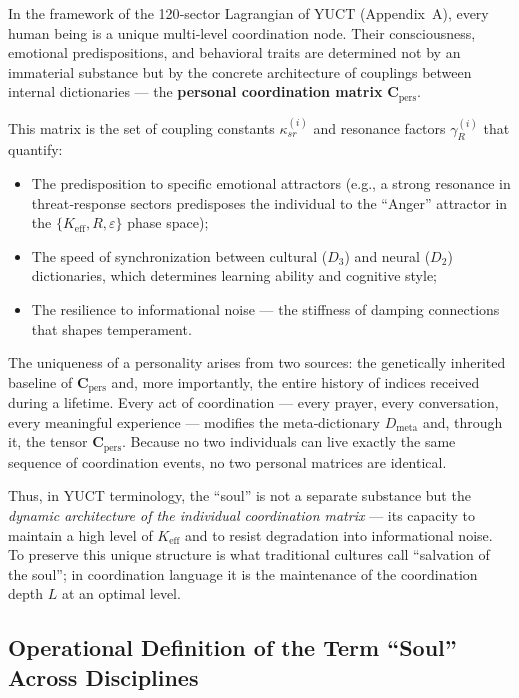 \documentclass[12pt,a4paper]{article}
\begin{document}
	In the framework of the 120‑sector Lagrangian of YUCT (Appendix~A), every human being is a unique multi‑level coordination node. Their consciousness, emotional predispositions, and behavioral traits are determined not by an immaterial substance but by the concrete architecture of couplings between internal dictionaries — the \textbf{personal coordination matrix} \(\mathbf{C}_{\text{pers}}\).
	
	This matrix is the set of coupling constants \(\kappa_{sr}^{(i)}\) and resonance factors \(\gamma_{R}^{(i)}\) that quantify:
	\begin{itemize}
		\item The predisposition to specific emotional attractors (e.g., a strong resonance in threat‑response sectors predisposes the individual to the ``Anger'' attractor in the \(\{K_{\mathrm{eff}}, R, \varepsilon\}\) phase space);
		\item The speed of synchronization between cultural (\(D_3\)) and neural (\(D_2\)) dictionaries, which determines learning ability and cognitive style;
		\item The resilience to informational noise — the stiffness of damping connections that shapes temperament.
	\end{itemize}
	
	The uniqueness of a personality arises from two sources: the genetically inherited baseline of \(\mathbf{C}_{\text{pers}}\) and, more importantly, the entire history of indices received during a lifetime. Every act of coordination — every prayer, every conversation, every meaningful experience — modifies the meta‑dictionary \(D_{\text{meta}}\) and, through it, the tensor \(\mathbf{C}_{\text{pers}}\). Because no two individuals can live exactly the same sequence of coordination events, no two personal matrices are identical.
	
	Thus, in YUCT terminology, the ``soul'' is not a separate substance but the \emph{dynamic architecture of the individual coordination matrix} — its capacity to maintain a high level of \(K_{\mathrm{eff}}\) and to resist degradation into informational noise. To preserve this unique structure is what traditional cultures call ``salvation of the soul''; in coordination language it is the maintenance of the coordination depth \(L\) at an optimal level.
	
\subsection{Operational Definition of the Term ``Soul'' Across Disciplines}
\label{subsec:soul-definition}
\end{document}
